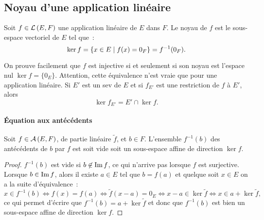 \subsection{Noyau d'une application linéaire}
\label{subsec-chap0:Noyau}
\begin{defdef}
	Soit $f \in \mathcal{L}\left(E,F\right)$ une application linéaire de $E$ dans $F$.  Le noyau de $f$ est le sous-espace vectoriel de $E$ tel que~:
	\begin{equation}
		\ker{f} = \left\{x \in E\mathrel{}\middle|\mathrel{}f(x)=0_F\right\} = f^{-1}(0_F).
	\end{equation}
\end{defdef}

On prouve facilement que $f$ est injective si et seulement si son noyau est l'espace nul $\ker{f} = \{0_E\}$. Attention, cette équivalence n'est vraie que pour une application linéaire. Si $E'$ est un sev de $E$ et si $f_{E'}$ est une restriction de $f$ à $E'$, alors 
\begin{equation}
	\ker{f_{E'}} = E' \cap \ker{f}.
\end{equation}
\paragraph{Équation aux antécédents}
\begin{prop}
	Soit $f \in \mathcal{A}\left(E,F\right)$, de partie linéaire $\tilde{f}$, et $b \in F$. L'ensemble $f^{-1}(b)$ des antécédents de $b$ par $f$ est soit vide soit un sous-espace affine de direction $\ker{f}$.
\end{prop}
\begin{proof}
	$f^{-1}(b)$ est vide si $b \not\in \operatorname{Im}{f}$, ce qui n'arrive pas lorsque $f$ est surjective. Lorsque $b \in \operatorname{Im}{f}$, alors il existe $a \in E$ tel que $b=f(a)$ et quelque soit $x \in E$ on a la suite d'équivalence~:
	\begin{equation}
		x \in f^{-1}(b) \iff f(x)=f(a) \iff \tilde{f}(x-a)=0_E \iff x-a \in \ker{\tilde{f}} \iff x \in a + \ker{\tilde{f}},
	\end{equation}
	ce qui permet d'écrire que $f^{-1}(b) = a + \ker{\tilde{f}}$ et donc que $f^{-1}(b)$ est bien un sous-espace affine de direction $\ker{f}$.
\end{proof}
